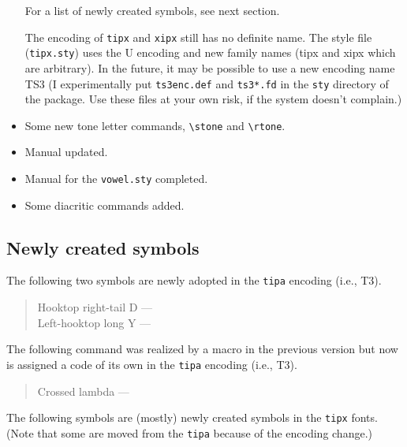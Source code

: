 \begin{itemize}
  For a list of newly created symbols, see next section.

  The encoding of \texttt{tipx} and \texttt{xipx} still has no
  definite name. The style file (\texttt{tipx.sty}) uses the
  U encoding and new family names (tipx and xipx which are arbitrary).
  In the future, it may be possible to use a new encoding name TS3
  (I experimentally put \texttt{ts3enc.def} and \texttt{ts3*.fd} in
  the \texttt{sty} directory of the package. Use
  these files at your own risk, if the system doesn't complain.)

\item Some new tone letter commands, \verb|\stone| and \verb|\rtone|.
\item Manual updated.
\item Manual for the \texttt{vowel.sty} completed.
\item Some diacritic commands added.
\end{itemize}

\subsection{Newly created symbols}\label{sec:newsymbols}

The following two symbols are newly adopted in the \texttt{tipa}
encoding (i.e., T3).

\begin{quote}
Hooktop right-tail D --- \texthtrtaild\\
Left-hooktop long Y --- \textlhtlongy
\end{quote}

The following command was realized by a macro in the previous version
but now is assigned a code of its own in the \texttt{tipa} encoding
(i.e., T3).

\begin{quote}
Crossed lambda --- \textcrlambda
\end{quote}

The following symbols are (mostly) newly created symbols in the
\texttt{tipx} fonts. (Note that some are moved from the \texttt{tipa}
because of the encoding change.)

